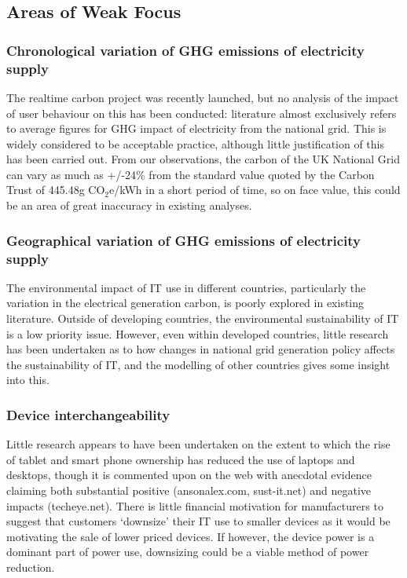 \documentclass[conference]{IEEEtran}
\begin{document}
\subsection{Areas of Weak Focus}

\subsubsection{Chronological variation of GHG emissions of electricity
  supply}

The realtime carbon project was recently launched, but no analysis of
the impact of user behaviour on this has been conducted: literature
almost exclusively refers to average figures for GHG impact of
electricity from the national grid. This is widely considered to be
acceptable practice, although little justification of this has been
carried out. From our observations, the carbon of the UK National Grid
can vary as much as +/-24\% from the standard value quoted by the
Carbon Trust of 445.48g CO$_2$e/kWh in a short period of time, so on face
value, this could be an area of great inaccuracy in existing analyses.

\subsubsection{Geographical variation of GHG emissions of electricity
  supply}

The environmental impact of IT use in different countries,
particularly the variation in the electrical generation carbon, is
poorly explored in existing literature. Outside of developing
countries, the environmental sustainability of IT is a low priority
issue. However, even within developed countries, little research has
been undertaken as to how changes in national grid generation policy
affects the sustainability of IT, and the modelling of other countries
gives some insight into this.

\subsubsection{Device interchangeability}

Little research appears to have been undertaken on the extent to which
the rise of tablet and smart phone ownership has reduced the use of
laptops and desktops, though it is commented upon on the web with
anecdotal evidence claiming both substantial positive (ansonalex.com,
sust-it.net) and negative impacts (techeye.net). There is little
financial motivation for manufacturers to suggest that customers
`downsize' their IT use to smaller devices as it would be motivating
the sale of lower priced devices. If however, the device power is a
dominant part of power use, downsizing could be a viable method of
power reduction.
\end{document}
